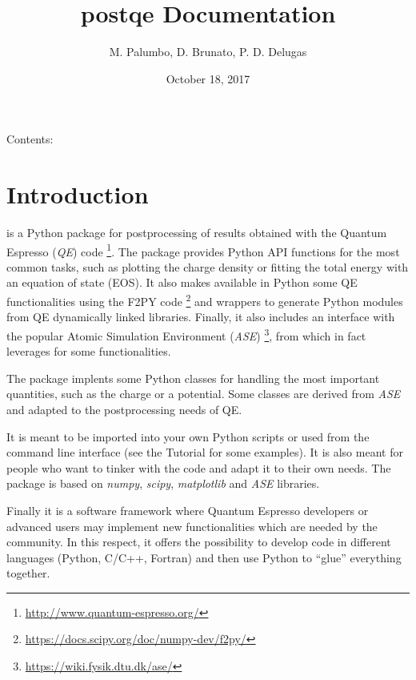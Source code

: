 \documentclass[letterpaper,10pt,english]{sphinxmanual}
\title{postqe Documentation}
\date{October 18, 2017}
\author{M. Palumbo, D. Brunato, P. D. Delugas}
\begin{document}
\maketitle
\tableofcontents
{}\label{index::doc}


Contents:


\chapter{Introduction}
\label{introduction:id1}\label{introduction:welcome-to-postqe-s-documentation}\label{introduction::doc}\label{introduction:introduction}
 is a Python package for postprocessing of results obtained with the Quantum Espresso (\emph{QE}) code \footnote[1]{
\href{http://www.quantum-espresso.org/}{http://www.quantum-espresso.org/}
}. The package provides Python API functions for the most common tasks, such as plotting the charge density or fitting the total energy with an equation of state (EOS). It also makes available in Python some QE functionalities using the F2PY code \footnote[2]{
\href{https://docs.scipy.org/doc/numpy-dev/f2py/}{https://docs.scipy.org/doc/numpy-dev/f2py/}
} and wrappers to generate Python modules from QE dynamically linked libraries. Finally, it also includes an interface with the popular Atomic Simulation Environment (\emph{ASE}) \footnote[3]{
\href{https://wiki.fysik.dtu.dk/ase/}{https://wiki.fysik.dtu.dk/ase/}
}, from which in fact leverages for some functionalities.

The package implents some Python classes for handling the most important quantities, such as the charge or a potential. Some classes are derived from \emph{ASE} and adapted to the postprocessing needs of QE.

It is meant to be imported into your own Python scripts or used from the command line interface (see the Tutorial for some examples). It is also meant for people who want to tinker with the code and adapt it to their own needs. The package is based on \emph{numpy}, \emph{scipy}, \emph{matplotlib} and \emph{ASE} libraries.

Finally it is a software framework where Quantum Espresso developers or advanced users may implement new functionalities which are needed by the community. In this respect, it offers the possibility to develop code in different languages (Python, C/C++, Fortran) and then use Python to ``glue'' everything together.
\end{document}
